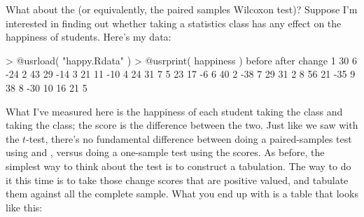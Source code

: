 

What about the  (or equivalently, the paired samples Wilcoxon test)? Suppose I'm interested in finding out whether taking a statistics class has any effect on the happiness of students. Here's my data:
\begin{rblock1}
> @usr{load( "happy.Rdata" )}
> @usr{print( happiness )}
   before after change
1      30     6    -24
2      43    29    -14
3      21    11    -10
4      24    31      7
5      23    17     -6
6      40     2    -38
7      29    31      2
8      56    21    -35
9      38     8    -30
10     16    21      5
\end{rblock1}
What I've measured here is the happiness of each student  taking the class and  taking the class; the  score is the difference between the two. Just like we saw with the $t$-test, there's no fundamental difference between doing a paired-samples test using  and , versus doing a one-sample test using the  scores. As before, the simplest way to think about the test is to construct a tabulation. The way to do it this time is to take those change scores that are positive valued, and tabulate them against all the complete sample. What you end up with is a table that looks like this:



